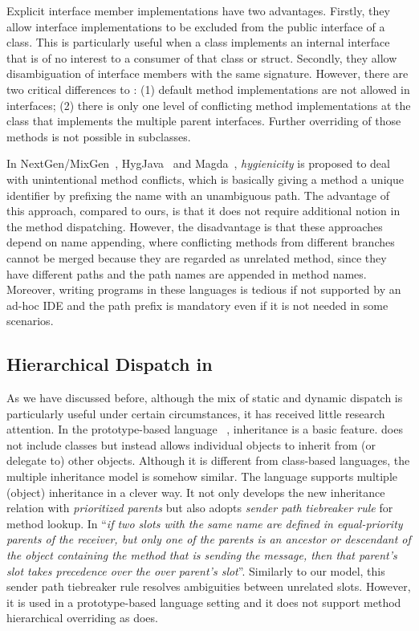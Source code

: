 Explicit interface member implementations have two advantages.
Firstly, they allow interface implementations to be excluded 
from the public interface of a class. This is particularly useful when a class implements an internal 
interface that is of no interest to a consumer of that class or struct.
Secondly, they allow disambiguation of interface members with the 
same signature. However, there are two critical differences to \MIM{}:
(1) default method implementations are not allowed in \csharp{} interfaces; 
(2) there is only one level of conflicting method implementations at the
class that implements the multiple parent interfaces. Further
overriding of those methods is not possible in subclasses.

In NextGen/MixGen~\cite{Allen:2003:FAG:949305.949316}, HygJava~\cite{kusmierek2007hygienic} and Magda~\cite{Bono:2012:MNL:2367163.2367198}, \emph{hygienicity} is proposed to deal with unintentional method conflicts, which is basically giving a method a unique identifier by prefixing the name with an unambiguous path. The advantage of this approach, compared to ours, is that it does not require additional notion in the method dispatching. However, the disadvantage is that these approaches depend on name appending, where conflicting methods from different branches cannot be merged because they are regarded as unrelated method, since they have different paths and the path names are appended in method names. Moreover, writing programs in these languages is tedious if not supported by an ad-hoc IDE and the path prefix is mandatory even if it is not needed in some scenarios.

\subsection{Hierarchical Dispatch in \self{}}
As we have discussed before, although the mix of static and dynamic dispatch is 
particularly useful under certain circumstances, it has received little research attention. 
In the prototype-based language \self{}~\cite{Chambers1991}, inheritance is a basic feature.
\self{} does not include classes but instead allows individual objects to inherit from (or delegate to) other objects. 
Although it is different from class-based languages, the multiple inheritance model is somehow similar. The \self{}
language supports multiple (object) inheritance in a clever way. It not only develops the new inheritance
relation with \emph{prioritized parents} but also adopts \emph{sender path tiebreaker rule} for method lookup.
In \self{} ``\emph{if two slots with the same name are defined in equal-priority parents of the receiver, but only 
one of the parents is an ancestor or descendant of the object containing the method that is sending the message,
then that parent's slot takes precedence over the over parent's slot}''. 
Similarly to our model, this sender path tiebreaker rule resolves ambiguities between unrelated slots. However,
it is used in a prototype-based language setting and it does not support method hierarchical overriding as \MIM{} does.

